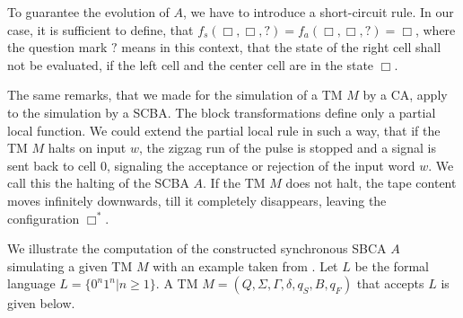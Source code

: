 \documentclass[pre,amssymb,showpacs,showkeys,preprint]{revtex4}
\begin{document}


To guarantee the evolution of $A$, we have to introduce a short-circuit rule.
In our case, it is sufficient to define, that $f_s(\Box, \Box, ?) = f_a(\Box, \Box, ?) = \Box$,
where the question mark $?$ means in this context, that the state of the right cell shall not be
evaluated, if the left cell and the center cell are in the state $\Box$.

The same remarks, that we made for the simulation of a TM $M$ by a CA, apply to the simulation by a
SCBA.
The block transformations define only a partial local function.
We could extend the partial local rule in such a way, that if the TM $M$ halts on input $w$,
the zigzag run of the pulse is stopped and a signal is sent back to cell 0, signaling the
acceptance or rejection of the input word $w$.
We call this the halting of the SCBA $A$.
If the TM $M$ does not halt, the tape content moves infinitely downwards, till it completely
disappears, leaving the configuration $\mathbf{\Box^*}$.

We illustrate the computation of the constructed synchronous SBCA $A$ simulating a given TM $M$
with an example taken from \cite{hopcroft}.
Let $L$ be the formal language $L=\{0^n1^n|n \geq 1\}$.
A TM $M=(Q,\Sigma,\Gamma, \delta, q_S, B, q_F)$ that accepts $L$ is given below.
\end{document}
